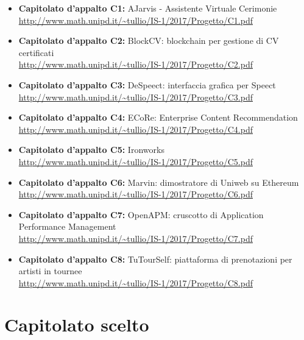 \documentclass[openany,12pt,a4paper]{report}
\begin{document}
	\begin{itemize}
		\item \textbf{Capitolato d'appalto C1:} AJarvis - Assistente Virtuale Cerimonie  \\ \url{http://www.math.unipd.it/~tullio/IS-1/2017/Progetto/C1.pdf}

		\item \textbf{Capitolato d'appalto C2:} BlockCV: blockchain per gestione di CV certificati \\ \url{http://www.math.unipd.it/~tullio/IS-1/2017/Progetto/C2.pdf}

		\item \textbf{Capitolato d'appalto C3:} DeSpeect: interfaccia grafica per Speect \\ \url{http://www.math.unipd.it/~tullio/IS-1/2017/Progetto/C3.pdf}

		\item \textbf{Capitolato d'appalto C4:} ECoRe: Enterprise Content Recommendation \\ \url{http://www.math.unipd.it/~tullio/IS-1/2017/Progetto/C4.pdf}

		\item \textbf{Capitolato d'appalto C5:} Ironworks \\ \url{http://www.math.unipd.it/~tullio/IS-1/2017/Progetto/C5.pdf}

		\item \textbf{Capitolato d'appalto C6:} Marvin: dimostratore di Uniweb su Ethereum \\ \url{http://www.math.unipd.it/~tullio/IS-1/2017/Progetto/C6.pdf}

		\item \textbf{Capitolato d'appalto C7:} OpenAPM: cruscotto di Application Performance Management \\ \url{http://www.math.unipd.it/~tullio/IS-1/2017/Progetto/C7.pdf}

		\item \textbf{Capitolato d'appalto C8:} TuTourSelf: piattaforma di prenotazioni per artisti in tournee \\ \url{http://www.math.unipd.it/~tullio/IS-1/2017/Progetto/C8.pdf}
	\end{itemize}


	\chapter{Capitolato scelto}
\end{document}
